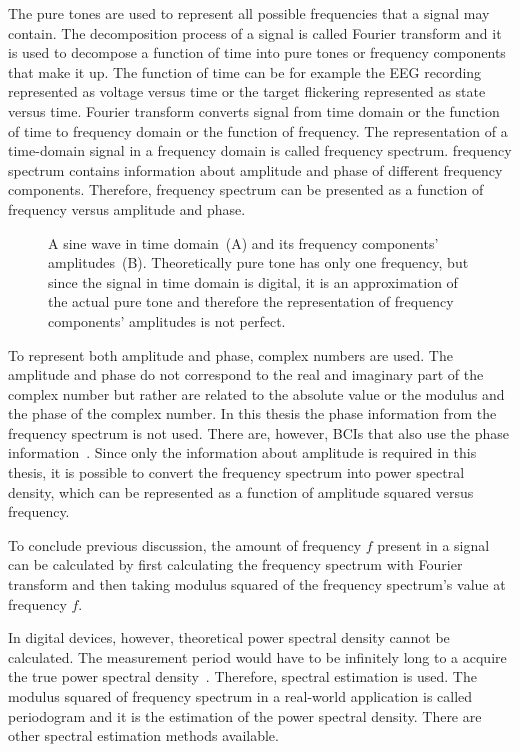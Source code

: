 The \glspl{pure tone} are used to represent all possible frequencies that a signal may contain. The decomposition process of a signal is called \gls{Fourier transform} and it is used to decompose a function of time into \glspl{pure tone} or \glspl{frequency component} that make it up. The function of time can be for example the \gls{EEG} recording represented as voltage versus time or the \gls{target} \gls{flickering} represented as \gls{state} versus time. \Gls{Fourier transform} converts signal from time domain or the function of time to frequency domain or the function of frequency. The representation of a time-domain signal in a frequency domain is called \gls{frequency spectrum}. \Gls{frequency spectrum} contains information about amplitude and phase of different \glspl{frequency component}. Therefore, \gls{frequency spectrum} can be presented as a function of frequency versus amplitude and phase.

\begin{figure}[h]
	
	\caption{A sine wave in time domain~(A) and its frequency components' amplitudes~(B). Theoretically pure tone has only one frequency, but since the signal in time domain is digital, it is an approximation of the actual pure tone and therefore the representation of frequency components' amplitudes is not perfect.}
	\label{fig:pure_tone}
\end{figure}

To represent both amplitude and phase, complex numbers are used. The amplitude and phase do not correspond to the real and imaginary part of the complex number but rather are related to the absolute value or the modulus and the phase of the complex number. In this thesis the phase information from the \gls{frequency spectrum} is not used. There are, however, \glspl{BCI} that also use the phase information~\cite{MPCC}. Since only the information about amplitude is required in this thesis, it is possible to convert the \gls{frequency spectrum} into \gls{power spectral density}, which can be represented as a function of amplitude squared versus frequency.

To conclude previous discussion, the amount of frequency $f$ present in a signal can be calculated by first calculating the \gls{frequency spectrum} with \gls{Fourier transform} and then taking modulus squared of the \gls{frequency spectrum}'s value at frequency $f$.

In digital devices, however, theoretical \gls{power spectral density} cannot be calculated. The measurement period would have to be infinitely long to a acquire the true \gls{power spectral density}~\cite{psd}. Therefore, spectral estimation is used. The modulus squared of frequency spectrum in a real-world application is called \gls{periodogram} and it is the estimation of the \gls{power spectral density}. There are other spectral estimation methods available.

